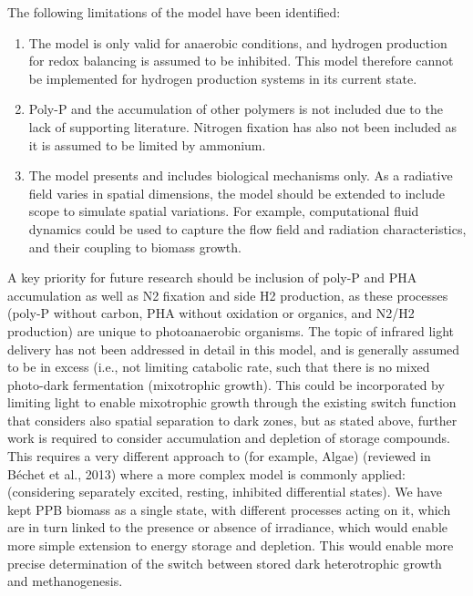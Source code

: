 The following limitations of the model have been identified:
\begin{enumerate}
    \item The model is only valid for anaerobic conditions, and hydrogen production for redox balancing is assumed to be inhibited. This model therefore cannot be implemented for hydrogen production systems in its current state.
    \item Poly-P and the accumulation of other polymers is not included due to the lack of supporting literature. Nitrogen fixation has also not been included as it is assumed to be limited by ammonium.
    \item The model presents and includes biological mechanisms only. As a radiative field varies in spatial dimensions, the model should be extended to include scope to simulate spatial variations. For example, computational fluid dynamics could be used to capture the flow field and radiation characteristics, and their coupling to biomass growth. 
\end{enumerate}


A key priority for future research should be inclusion of poly-P and PHA accumulation as well as N2 fixation and side H2 production, as these processes (poly-P without carbon, PHA without oxidation or organics, and N2/H2 production) are unique to photoanaerobic organisms. The topic of infrared light delivery has not been addressed in detail in this model, and is generally assumed to be in excess (i.e., not limiting catabolic rate, such that there is no mixed photo-dark fermentation (mixotrophic growth). This could be incorporated by limiting light to enable mixotrophic growth through the existing switch function that considers also spatial separation to dark zones, but as stated above, further work is required to consider accumulation and depletion of storage compounds. This requires a very different approach to (for example, Algae) (reviewed in Béchet et al., 2013) where a more complex model is commonly applied: (considering separately excited, resting, inhibited differential states). We have kept PPB biomass as a single state, with different processes acting on it, which are in turn linked to the presence or absence of irradiance, which would enable more simple extension to energy storage and depletion. This would enable more precise determination of the switch between stored dark heterotrophic growth and methanogenesis.
